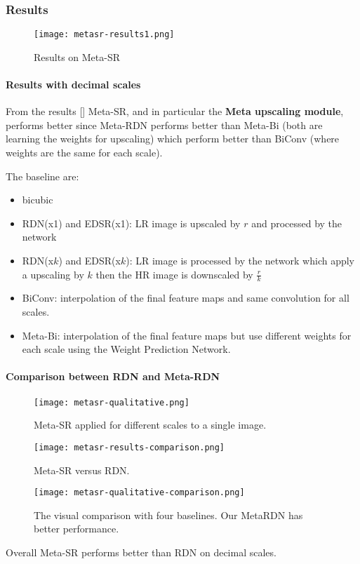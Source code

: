 \subsubsection{Results}

\begin{figure}
    \centering
    \texttt{[image: metasr-results1.png]}
    \caption{Results on Meta-SR}\label{metasr:results}
\end{figure}

\paragraph{Results with decimal scales}
From the results [] Meta-SR, and in particular the \textbf{Meta upscaling module}, performs better since Meta-RDN performs better than Meta-Bi (both are learning the weights for upscaling) which perform better than BiConv (where weights are the same for each scale).

The baseline are:
\begin{itemize}
    \item bicubic
    \item RDN(x1) and EDSR(x1): LR image is upscaled by $r$ and processed by the network
    \item RDN(x$k$) and EDSR(x$k$): LR image is processed by the network which apply a upscaling by $k$ then the HR image is downscaled by $\frac{r}{k}$
    \item BiConv: interpolation of the final feature maps and same convolution for all scales.
    \item Meta-Bi: interpolation of the final feature maps but use different weights for each scale using the Weight Prediction Network. 
\end{itemize}

\paragraph{Comparison between RDN and Meta-RDN}
\begin{figure}
    \centering
    \texttt{[image: metasr-qualitative.png]}
    \caption{Meta-SR applied for different scales to a single image.}
\end{figure}

\begin{figure}
    \centering
    \texttt{[image: metasr-results-comparison.png]}
    \caption{Meta-SR versus RDN.}
\end{figure}

\begin{figure}
    \centering
    \texttt{[image: metasr-qualitative-comparison.png]}
    \caption{The visual comparison with four baselines. Our MetaRDN has better performance.}
\end{figure}

Overall Meta-SR performs better than RDN on decimal scales.